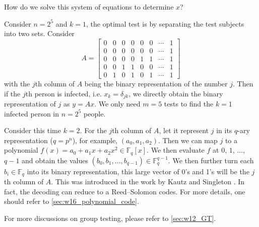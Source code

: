 How do we solve this system of equations to determine $x$?
\begin{example}
    Consider $n=2^5$ and $k=1$, the optimal test is by separating the test subjects into two sets. Consider
    \begin{equation*}
        A = \left[\begin{matrix}
            0 & 0 & 0 & 0 & 0 & 0 & \cdots & 1 \\
            0 & 0 & 0 & 0 & 0 & 0 & \cdots & 1 \\
            0 & 0 & 0 & 0 & 1 & 1 & \cdots & 1 \\
            0 & 0 & 1 & 1 & 0 & 0 & \cdots & 1 \\
            0 & 1 & 0 & 1 & 0 & 1 & \cdots & 1 
        \end{matrix}\right]
    \end{equation*}
    with the $j$th column of $A$ being the binary representation of the number $j$. Then if the $j$th person is infected, i.e. $x_k = \delta_{jk}$, we directly obtain the binary representation of $j$ as $y=Ax$. We only need $m=5$ tests to find the $k=1$ infected person in $n=2^5$ people.
\end{example}

\begin{example}
    Consider this time $k=2$. For the $j$th column of $A$, let it represent $j$ in its $q$-ary representation ($q=p^n$), for example, $(a_0,a_1,a_2)$. Then we can map $j$ to a polynomial $f(x) = a_0 + a_1x + a_2x^2\in\mathbb{F}_q[x]$. We then evaluate $f$ at $0$, $1$, $\ldots$, $q-1$ and obtain the values $(b_0,b_1,\ldots,b_{q-1})\in\mathbb{F}_q^{q-1}$. We then further turn each $b_i\in\mathbb{F}_q$ into its binary representation, this large vector of 0's and 1's will be the $j$th column of $A$. This was introduced in the work by Kautz and Singleton \cite{Kautz_Singleton_64}. In fact, the decoding can reduce to a Reed--Solomon codes. For more details, one should refer to \autoref{sec:w16_polynomial_code}.
\end{example}




For more discussions on group testing, please refer to \autoref{sec:w12_GT}.